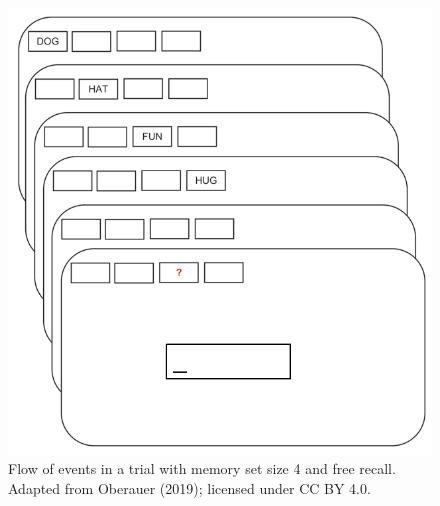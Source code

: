 \documentclass[12pt,ignorenonframetext,aspectratio=169]{beamer}
\begin{document}
\begin{frame}



\small

\begin{figure}
\centering
\includegraphics{cc_figure/fig1_oberauer_2019_modified.png}
\caption{\label{fig:oberauer}Flow of events in a trial with memory set size 4 and free recall. Adapted from Oberauer (2019); licensed under CC BY 4.0.}
\end{figure}

\normalsize

\end{frame}
\end{document}
